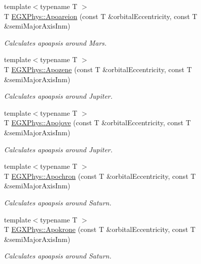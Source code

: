 \begin{DoxyCompactItemize}
{\footnotesize template$<$typename T $>$ }\\T \mbox{\hyperlink{group___e_g_x_phys-_apoapsis_ga8a44d21df90f3e6e9168b871a5b7f26b}{E\+G\+X\+Phys\+::\+Apoareion}} (const T \&orbital\+Eccentricity, const T \&semi\+Major\+Axis\+Inm)
\begin{DoxyCompactList}\small\item\em Calculates apoapsis around Mars. \end{DoxyCompactList}\item 
{\footnotesize template$<$typename T $>$ }\\T \mbox{\hyperlink{group___e_g_x_phys-_apoapsis_ga2de1f63be8e4e22f219c4e947588a207}{E\+G\+X\+Phys\+::\+Apozene}} (const T \&orbital\+Eccentricity, const T \&semi\+Major\+Axis\+Inm)
\begin{DoxyCompactList}\small\item\em Calculates apoapsis around Jupiter. \end{DoxyCompactList}\item 
{\footnotesize template$<$typename T $>$ }\\T \mbox{\hyperlink{group___e_g_x_phys-_apoapsis_gad2a2021d43526fc752fe87beff789b28}{E\+G\+X\+Phys\+::\+Apojove}} (const T \&orbital\+Eccentricity, const T \&semi\+Major\+Axis\+Inm)
\begin{DoxyCompactList}\small\item\em Calculates apoapsis around Jupiter. \end{DoxyCompactList}\item 
{\footnotesize template$<$typename T $>$ }\\T \mbox{\hyperlink{group___e_g_x_phys-_apoapsis_gac978de20a08121198f73637018c80eee}{E\+G\+X\+Phys\+::\+Apochron}} (const T \&orbital\+Eccentricity, const T \&semi\+Major\+Axis\+Inm)
\begin{DoxyCompactList}\small\item\em Calculates apoapsis around Saturn. \end{DoxyCompactList}\item 
{\footnotesize template$<$typename T $>$ }\\T \mbox{\hyperlink{group___e_g_x_phys-_apoapsis_ga572bf783c39ce472a06e89063f1fd1a7}{E\+G\+X\+Phys\+::\+Apokrone}} (const T \&orbital\+Eccentricity, const T \&semi\+Major\+Axis\+Inm)
\begin{DoxyCompactList}\small\item\em Calculates apoapsis around Saturn. \end{DoxyCompactList}\item 

\end{DoxyCompactItemize}
